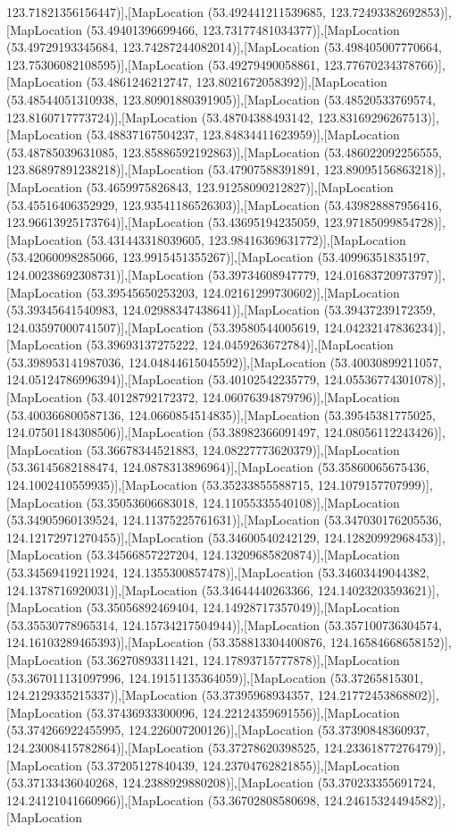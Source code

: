 123.71821356156447)],[MapLocation (53.492441211539685, 123.72493382692853)],[MapLocation (53.49401396699466, 123.73177481034377)],[MapLocation (53.49729193345684, 123.74287244082014)],[MapLocation (53.498405007770664, 123.75306082108595)],[MapLocation (53.49279490058861, 123.77670234378766)],[MapLocation (53.4861246212747, 123.8021672058392)],[MapLocation (53.48544051310938, 123.80901880391905)],[MapLocation (53.48520533769574, 123.8160717773724)],[MapLocation (53.48704388493142, 123.83169296267513)],[MapLocation (53.48837167504237, 123.84834411623959)],[MapLocation (53.48785039631085, 123.85886592192863)],[MapLocation (53.486022092256555, 123.86897891238218)],[MapLocation (53.47907588391891, 123.89095156863218)],[MapLocation (53.4659975826843, 123.91258090212827)],[MapLocation (53.45516406352929, 123.93541186526303)],[MapLocation (53.439828887956416, 123.96613925173764)],[MapLocation (53.43695194235059, 123.97185099854728)],[MapLocation (53.431443318039605, 123.98416369631772)],[MapLocation (53.42060098285066, 123.9915451355267)],[MapLocation (53.40996351835197, 124.00238692308731)],[MapLocation (53.39734608947779, 124.01683720973797)],[MapLocation (53.39545650253203, 124.02161299730602)],[MapLocation (53.39345641540983, 124.02988347438641)],[MapLocation (53.39437239172359, 124.03597000741507)],[MapLocation (53.39580544005619, 124.04232147836234)],[MapLocation (53.39693137275222, 124.0459263672784)],[MapLocation (53.398953141987036, 124.04844615045592)],[MapLocation (53.40030899211057, 124.05124786996394)],[MapLocation (53.40102542235779, 124.05536774301078)],[MapLocation (53.40128792172372, 124.06076394879796)],[MapLocation (53.400366800587136, 124.0660854514835)],[MapLocation (53.39545381775025, 124.07501184308506)],[MapLocation (53.38982366091497, 124.08056112243426)],[MapLocation (53.36678344521883, 124.08227773620379)],[MapLocation (53.36145682188474, 124.0878313896964)],[MapLocation (53.35860065675436, 124.1002410559935)],[MapLocation (53.35233855588715, 124.1079157707999)],[MapLocation (53.35053606683018, 124.11055335540108)],[MapLocation (53.34905960139524, 124.11375225761631)],[MapLocation (53.347030176205536, 124.12172971270455)],[MapLocation (53.34600540242129, 124.12820992968453)],[MapLocation (53.34566857227204, 124.13209685820874)],[MapLocation (53.34569419211924, 124.1355300857478)],[MapLocation (53.34603449044382, 124.1378716920031)],[MapLocation (53.34644440263366, 124.14023203593621)],[MapLocation (53.35056892469404, 124.14928717357049)],[MapLocation (53.35530778965314, 124.15734217504944)],[MapLocation (53.357100736304574, 124.16103289465393)],[MapLocation (53.358813304400876, 124.16584668658152)],[MapLocation (53.36270893311421, 124.17893715777878)],[MapLocation (53.367011131097996, 124.19151135364059)],[MapLocation (53.37265815301, 124.2129335215337)],[MapLocation (53.37395968934357, 124.21772453868802)],[MapLocation (53.37436933300096, 124.22124359691556)],[MapLocation (53.374266922455995, 124.226007200126)],[MapLocation (53.37390848360937, 124.23008415782864)],[MapLocation (53.37278620398525, 124.23361877276479)],[MapLocation (53.37205127840439, 124.23704762821855)],[MapLocation (53.37133436040268, 124.2388929880208)],[MapLocation (53.370233355691724, 124.24121041660966)],[MapLocation (53.36702808580698, 124.24615324494582)],[MapLocation 